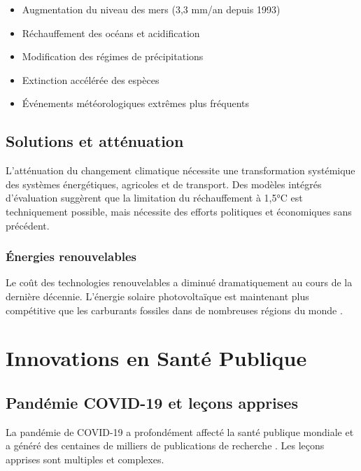 \documentclass[12pt,a4paper,twoside,openright,openany]{book}
\begin{document}
	\begin{itemize}
		\item Augmentation du niveau des mers (3,3 mm/an depuis 1993)
		\item Réchauffement des océans et acidification
		\item Modification des régimes de précipitations
		\item Extinction accélérée des espèces
		\item Événements météorologiques extrêmes plus fréquents
	\end{itemize}
	
	\section{Solutions et atténuation}
	
	L'atténuation du changement climatique nécessite une transformation systémique des systèmes énergétiques, agricoles et de transport. Des modèles intégrés d'évaluation \cite{Calvin2017} suggèrent que la limitation du réchauffement à 1,5°C est techniquement possible, mais nécessite des efforts politiques et économiques sans précédent.
	
	\subsection{Énergies renouvelables}
	
	Le coût des technologies renouvelables a diminué dramatiquement au cours de la dernière décennie. L'énergie solaire photovoltaïque est maintenant plus compétitive que les carburants fossiles dans de nombreuses régions du monde \cite{IRENA2021}.
	
	\newpage
	
	\chapter{Innovations en Santé Publique}
	\label{ch:sante}
	
	\section{Pandémie COVID-19 et leçons apprises}
	
	La pandémie de COVID-19 a profondément affecté la santé publique mondiale et a généré des centaines de milliers de publications de recherche \cite{WHO2021}. Les leçons apprises sont multiples et complexes.
	
\end{document}
